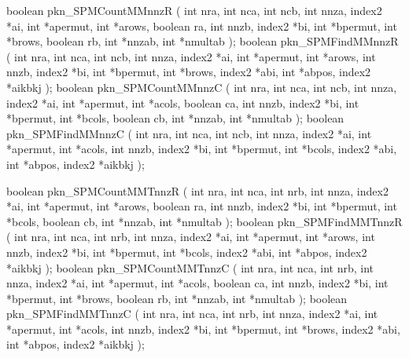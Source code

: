 \begin{listingC}
boolean pkn_SPMCountMMnnzR ( int nra, int nca, int ncb,
                             int nnza, index2 *ai,
                             int *apermut, int *arows, boolean ra,
                             int nnzb, index2 *bi,
                             int *bpermut, int *brows, boolean rb,
                             int *nnzab, int *nmultab );
boolean pkn_SPMFindMMnnzR ( int nra, int nca, int ncb,  
                            int nnza, index2 *ai, int *apermut, int *arows,
                            int nnzb, index2 *bi, int *bpermut, int *brows,
                            index2 *abi, int *abpos, index2 *aikbkj );
boolean pkn_SPMCountMMnnzC ( int nra, int nca, int ncb,
                             int nnza, index2 *ai,
                             int *apermut, int *acols, boolean ca,
                             int nnzb, index2 *bi,
                             int *bpermut, int *bcols, boolean cb,
                             int *nnzab, int *nmultab );
boolean pkn_SPMFindMMnnzC ( int nra, int nca, int ncb,  
                            int nnza, index2 *ai, int *apermut, int *acols,
                            int nnzb, index2 *bi, int *bpermut, int *bcols,
                            index2 *abi, int *abpos, index2 *aikbkj );
\end{listingC}

\begin{listingC}
boolean pkn_SPMCountMMTnnzR ( int nra, int nca, int nrb,
                              int nnza, index2 *ai,
                              int *apermut, int *arows, boolean ra,
                              int nnzb, index2 *bi,
                              int *bpermut, int *bcols, boolean cb,
                              int *nnzab, int *nmultab );
boolean pkn_SPMFindMMTnnzR ( int nra, int nca, int nrb,  
                             int nnza, index2 *ai, int *apermut, int *arows,
                             int nnzb, index2 *bi, int *bpermut, int *bcols,
                             index2 *abi, int *abpos, index2 *aikbkj );
boolean pkn_SPMCountMMTnnzC ( int nra, int nca, int nrb,
                              int nnza, index2 *ai,
                              int *apermut, int *acols, boolean ca,
                              int nnzb, index2 *bi,
                              int *bpermut, int *brows, boolean rb,
                              int *nnzab, int *nmultab );
boolean pkn_SPMFindMMTnnzC ( int nra, int nca, int nrb,  
                             int nnza, index2 *ai, int *apermut, int *acols,
                             int nnzb, index2 *bi, int *bpermut, int *brows,
                             index2 *abi, int *abpos, index2 *aikbkj );
\end{listingC}

